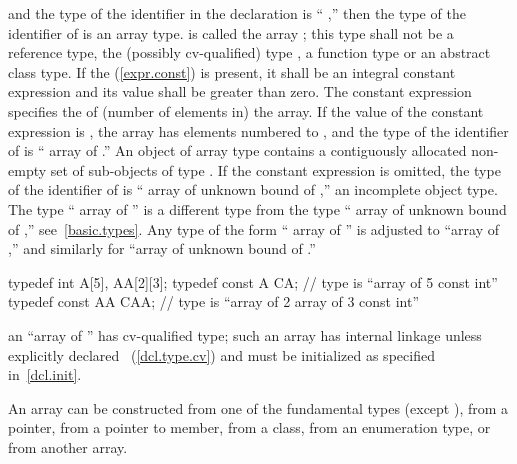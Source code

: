 and the type of the identifier in the declaration
is
``
,''
then the type of the identifier of
is an array type.
is called the array
;
this type shall not be a reference type, the (possibly cv-qualified) type
,
a function type or an abstract class type.
%
If the
(\ref{expr.const}) is present, it shall be an integral constant expression and
its value shall be greater than zero.
The constant expression specifies the
%
%
of (number of elements in) the array.
If the value of the constant expression is
,
the array has
elements numbered
to
,
and the type of the identifier of
is `` array of
.''
An object of array type contains a contiguously allocated non-empty set of
sub-objects of type
.
If the constant expression is omitted, the type of the identifier of
is `` array of unknown bound of
,''
an incomplete object type.
The type `` array of
''
is a different type from the type
`` array of unknown bound of
,''
see~\ref{basic.types}.
Any type of the form
`` array of
''
is adjusted to
``array of
,''
and similarly for
``array of unknown bound of
.''
\enterexample

\begin{codeblock}
typedef int A[5], AA[2][3];
typedef const A CA;             // type is ``array of 5 const int''
typedef const AA CAA;           // type is ``array of 2 array of 3 const int''
\end{codeblock}
\exitexampleb
\enternote
an
``array of
''
has cv-qualified type; such an array has internal linkage unless explicitly
declared ~(\ref{dcl.type.cv}) and must be initialized as
specified in~\ref{dcl.init}.
\exitnote

\pnum
An array can be constructed from one of the fundamental types
(except
),
from a pointer,
from a pointer to member, from a class,
from an enumeration type,
or from another array.

